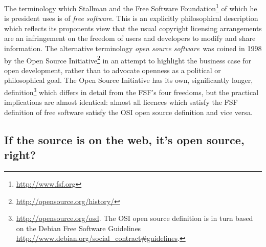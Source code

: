 \documentclass[a4paper,12pt]{article}
\begin{document}
The terminology which Stallman and the Free Software
Foundation\footnote{\url{http://www.fsf.org}} of which he is president uses
is of \textit{free software}. This is an explicitly philosophical description
which reflects its proponents view that the usual copyright licensing
arrangements are an infringement on the freedom of users and developers to
modify and share information. The alternative terminology \textit{open
  source software}\ was coined in 1998 by the Open Source
Initiative\footnote{\url{http://opensource.org/history/}} in an attempt to
highlight the business case for open development, rather than to advocate
openness as a political or philosophical goal. The Open Source Initiative
has its own, significantly longer,
definition\footnote{\url{http://opensource.org/osd}. The OSI open source
  definition is in turn based on the Debian Free Software Guidelines
  \url{http://www.debian.org/social_contract\#guidelines}.
} which differs in
detail from the FSF's four freedoms, but the practical implications are
almost identical: almost all licences which satisfy the FSF definition of free
software satisfy the OSI open source definition and vice versa.

\subsection{If the source is on the web, it's open source, right?}
\end{document}
